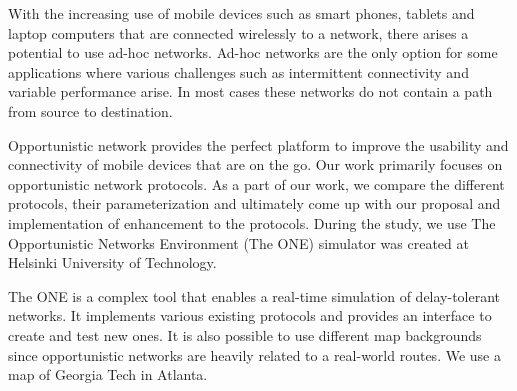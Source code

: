 \documentclass[conference]{IEEEtran}
\begin{document}
With the increasing use of mobile devices such as smart phones, tablets and laptop computers that are connected wirelessly to a network, there arises a potential to use ad-hoc networks. Ad-hoc networks are the only option for some applications where various challenges such as intermittent connectivity and variable performance arise. In most cases these networks do not contain a path from source to destination.

Opportunistic network provides the perfect platform to improve the usability and connectivity of mobile devices that are on the go. Our work primarily focuses on opportunistic network protocols. As a part of our work, we compare the different protocols, their parameterization and ultimately come up with our proposal and implementation of enhancement to the protocols. During the study, we use The Opportunistic Networks Environment (The ONE) simulator \cite{keranen-theone}was created at Helsinki University of Technology.

The ONE is a complex tool that enables a real-time simulation of delay-tolerant networks. It implements various existing protocols and provides an interface to create and test new ones. It is also possible to use different map backgrounds since opportunistic networks are heavily related to a real-world routes. We use a map of Georgia Tech in Atlanta.

%
%

\end{document}
